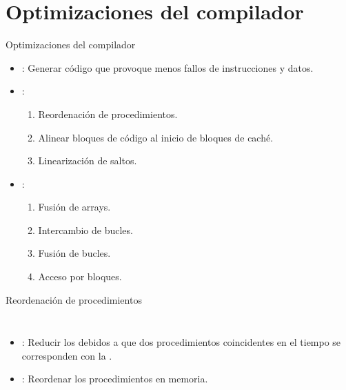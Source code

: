 \section{Optimizaciones del compilador}

\begin{frame}[t]{Optimizaciones del compilador}
\begin{itemize}
  \item {}:
        Generar código que provoque menos fallos de 
        instrucciones y datos.

  \item {}: 
    \begin{enumerate}[1.]
      \item Reordenación de procedimientos.
      \item Alinear bloques de código al inicio de bloques de caché.
      \item Linearización de saltos.
    \end{enumerate}

  \item {}: 
    \begin{enumerate}[1.]
      \item Fusión de arrays.
      \item Intercambio de bucles.
      \item Fusión de bucles.
      \item Acceso por bloques.
    \end{enumerate}
\end{itemize}
\end{frame}

\begin{frame}[t]{Reordenación de procedimientos}
\begin{columns}


\begin{itemize}
  \item {}: Reducir los  debidos a que 
        dos procedimientos coincidentes en el tiempo se corresponden 
        con la .

  \item {}: Reordenar los procedimientos en memoria.

\end{itemize}

\pause


\end{columns}
\end{frame}

